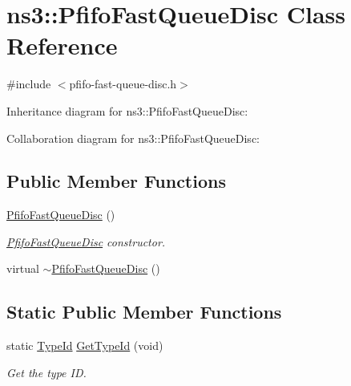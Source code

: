 \hypertarget{classns3_1_1PfifoFastQueueDisc}{}\section{ns3\+:\+:Pfifo\+Fast\+Queue\+Disc Class Reference}
\label{classns3_1_1PfifoFastQueueDisc}


{\ttfamily \#include $<$pfifo-\/fast-\/queue-\/disc.\+h$>$}



Inheritance diagram for ns3\+:\+:Pfifo\+Fast\+Queue\+Disc\+:


Collaboration diagram for ns3\+:\+:Pfifo\+Fast\+Queue\+Disc\+:
\subsection*{Public Member Functions}
\begin{DoxyCompactItemize}
\item 
\hyperlink{classns3_1_1PfifoFastQueueDisc_af0fd107e762495a1579be2e3913e6a97}{Pfifo\+Fast\+Queue\+Disc} ()
\begin{DoxyCompactList}\small\item\em \hyperlink{classns3_1_1PfifoFastQueueDisc}{Pfifo\+Fast\+Queue\+Disc} constructor. \end{DoxyCompactList}\item 
virtual \hyperlink{classns3_1_1PfifoFastQueueDisc_a47ca8d2c176b87e6b8e1ce9a3959b9e5}{$\sim$\+Pfifo\+Fast\+Queue\+Disc} ()
\end{DoxyCompactItemize}
\subsection*{Static Public Member Functions}
\begin{DoxyCompactItemize}
\item 
static \hyperlink{classns3_1_1TypeId}{Type\+Id} \hyperlink{classns3_1_1PfifoFastQueueDisc_a2c8d164b89f5934e2b0bbf261aba5bc9}{Get\+Type\+Id} (void)
\begin{DoxyCompactList}\small\item\em Get the type ID. \end{DoxyCompactList}\end{DoxyCompactItemize}

